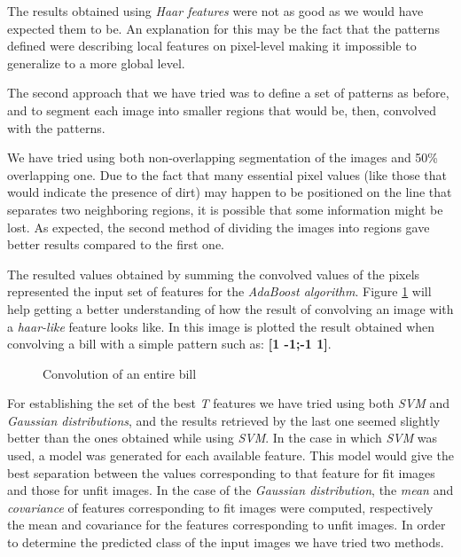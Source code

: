 \documentclass[11pt,twocolumn]{article}
\begin{document}
			The results obtained using \emph{Haar features} were not as	good as we would have expected them to be. An explanation for this may be the fact that the patterns defined were describing local features on pixel-level making it impossible to generalize to a more global level.
			
			The second approach that we have tried was to define a set of patterns as before, and to segment each image into smaller regions that would be, then, convolved with the patterns.
			
			We have tried using both non-overlapping segmentation of the images and 50\% overlapping one. Due to the fact that many essential pixel values (like those that would indicate the presence of dirt) may happen to be positioned on the line that separates two neighboring regions, it is possible that some information might be lost. As expected, the second method of dividing the images into regions gave better results compared to the first one.

			The resulted values obtained by summing the convolved values of the pixels represented the input set of features for the \emph{AdaBoost algorithm}. Figure \ref{convolved} will help getting a better understanding of how the result of convolving an image with a \emph{haar-like} feature looks like. In this image is plotted the result obtained when convolving a bill with a simple pattern such as: \textbf{[1 -1;-1 1]}.

			\begin{figure}[!hbtp]
				\centering
				\caption{Convolution of an entire bill}
				\label{convolved}
			\end{figure}

			For establishing the set of the best \emph{T} features we have tried using both \emph{SVM} and \emph{Gaussian distributions}, and the results retrieved by the last one seemed slightly better than the ones obtained while using \emph{SVM}. In the case in which \emph{SVM} was used, a model was generated for each available feature. This model would give the best separation between the values corresponding to that feature for fit images and those for unfit images. In the case of the \emph{Gaussian distribution}, the \emph{mean} and \emph{covariance} of features corresponding to fit images were computed, respectively the mean and covariance for the features corresponding to unfit images. In order to determine the predicted class of the input images we have tried two methods.
\end{document}
